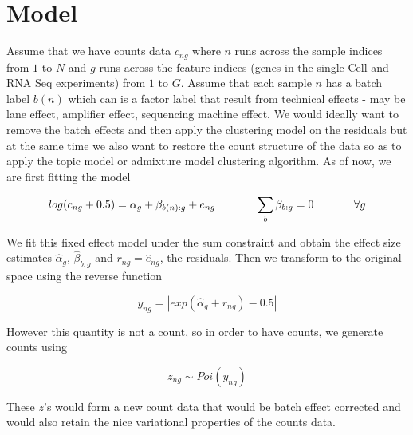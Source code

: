 \documentclass[11pt]{article}
\begin{document}
\section{Model}

Assume that we have counts data $c_{ng}$ where $n$ runs across the sample indices from $1$ to $N$ and $g$ runs across the feature indices (genes in the single Cell and RNA Seq experiments) from $1$ to $G$. Assume that each sample $n$ has a batch label $b(n)$ which can is a factor label that result from technical effects - may be lane effect, amplifier effect, sequencing machine effect. We would ideally want to remove the batch effects and then apply the clustering model on the residuals but at the same time we also want to restore the count structure of the data so as to apply the topic model or admixture model clustering algorithm.  As of now, we are first fitting the model

$$ log(c_{ng}+0.5) = \alpha_{g} + \beta_{b(n):g} + e_{ng}   \hspace{0.5 in} \sum_{b} \beta_{b:g} =0 \hspace{0.5 in} \forall g $$

We fit this fixed effect model under the sum constraint and obtain the effect size estimates $\hat{\alpha}_{g}$, $\hat{\beta}_{b:g}$ and $r_{ng}= \hat{e}_{ng}$, the residuals. Then we transform to the original space using the reverse function

$$ y_{ng} = \left | exp \left (\hat{\alpha}_{g} + r_{ng} \right ) - 0.5 \right | $$

However this quantity is not a count, so in order to have counts, we generate counts using 

$$ z_{ng} \sim Poi(y_{ng}) $$

These $z$'s would form a new count data that would be batch effect corrected and would also retain the nice variational properties of the counts data. 
\end{document}
